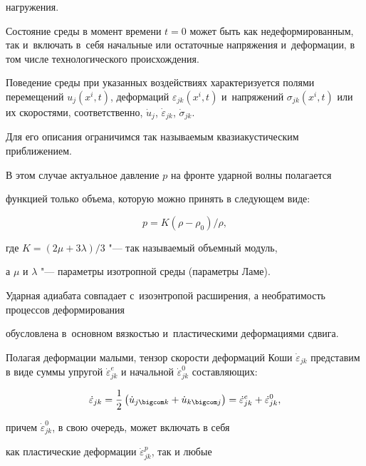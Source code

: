 нагружения.



Состояние среды в момент времени $t=0$ может быть как недеформированным, так и~включать в~себя начальные или остаточные напряжения и~деформации, в том числе технологического происхождения.



Поведение среды при указанных воздействиях характеризуется полями перемещений $u_j (x^i,t)$, деформаций $\varepsilon _{jk} (x^i,t)$ и~напряжений $\sigma _{jk} (x^i,t)$ или их скоростями, соответственно, $\dot {u}_j$, $\dot {\varepsilon }_{jk}$, $\dot {\sigma }_{jk} $. 

Для его описания ограничимся так называемым квазиакустическим приближением.



В этом случае актуальное давление $p$ на фронте ударной волны полагается

функцией только объема, которую можно принять в следующем виде: 

$$p=K(\rho -\rho _0 )/\rho ,$$ 

где  $K=(2\mu +3\lambda )/3$ "--- так называемый объемный модуль, 

а $\mu $ и $\lambda $ "--- параметры изотропной среды (параметры Ламе). 

Ударная адиабата совпадает с~изоэнтропой расширения, а необратимость процессов деформирования

обусловлена в~основном вязкостью и~пластическими деформациями сдвига.



Полагая деформации малыми, тензор скорости деформаций Коши $\dot

{\varepsilon }_{jk} $ представим в виде суммы упругой $\dot {\varepsilon

}_{jk}^e $ и начальной $\dot {\varepsilon }_{jk}^0 $ составляющих:

\begin{equation}

\label{petu:eq1}

\dot {\varepsilon }_{jk} =\frac{1}{2}\left(\dot {u}_{j\bigcom k} +\dot {u}_{k \bigcom j} \right)=\dot

{\varepsilon }_{jk}^e +\dot {\varepsilon }_{jk}^0,

\end{equation}

причем $\dot {\varepsilon }_{jk}^0 $, в свою очередь, может включать в себя

как пластические деформации $\dot {\varepsilon }_{jk}^p $, так и любые


